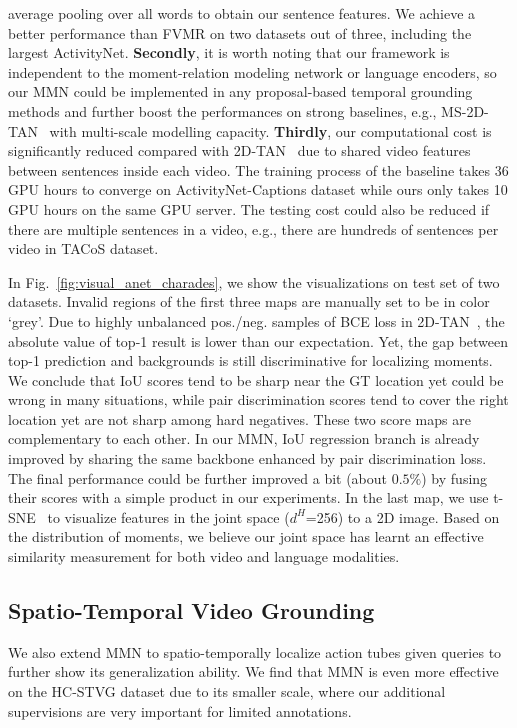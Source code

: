 \documentclass[letterpaper]{article} \usepackage{aaai22}  \usepackage{times}  \usepackage{helvet}  \usepackage{courier}  \usepackage[hyphens]{url}  \usepackage{graphicx} \urlstyle{rm} \def\UrlFont{\rm}  \usepackage{natbib}  \usepackage{caption} \DeclareCaptionStyle{ruled}{labelfont=normalfont,labelsep=colon,strut=off} \frenchspacing  \setlength{\pdfpagewidth}{8.5in}  \setlength{\pdfpageheight}{11in}  \usepackage{algorithm}
\begin{document}
average pooling over all words to obtain our sentence features. We achieve a better performance than FVMR on two datasets out of three, including the largest ActivityNet. 
{\bf Secondly}, it is worth noting that our framework is independent to the moment-relation modeling network or language encoders, so our MMN could be implemented in any proposal-based temporal grounding methods and further boost the performances on strong baselines, e.g., MS-2D-TAN~\cite{DBLP:journals/corr/abs-2012-02646} with multi-scale modelling capacity. 
{\bf Thirdly}, our computational cost is significantly reduced compared with 2D-TAN~\cite{DBLP:conf/aaai/ZhangPFL20} due to shared video features between sentences inside each video. The training process of the baseline takes 36 GPU hours to converge on ActivityNet-Captions dataset while ours only takes 10 GPU hours on the same GPU server. The testing cost could also be reduced if there are multiple sentences in a video, e.g., there are hundreds of sentences per video in TACoS dataset.

 In Fig.~\ref{fig:visual_anet_charades}, we show the visualizations on test set of two datasets. Invalid regions of the first three maps are manually set to be in color `grey'. Due to highly unbalanced pos./neg. samples of BCE loss in 2D-TAN~\cite{DBLP:conf/aaai/ZhangPFL20}, the absolute value of top-1 result is lower than our expectation. Yet, the gap between top-1 prediction and backgrounds is still discriminative for localizing moments. We conclude that IoU scores tend to be sharp near the GT location yet could be wrong in many situations, while pair discrimination scores tend to cover the right location yet are not sharp among hard negatives. These two score maps are complementary to each other. In our MMN, IoU regression branch is already improved by sharing the same backbone enhanced by pair discrimination loss. The final performance could be further improved a bit (about $0.5\%$) by fusing their scores with a simple product in our experiments. In the last map, we use t-SNE~\cite{JMLR:v9:vandermaaten08a} to visualize features in the joint space ($d^H$=256) to a 2D image. Based on the distribution of moments, we believe our joint space has learnt an effective similarity measurement for both video and language modalities.

\subsection{Spatio-Temporal Video Grounding}
We also extend MMN to spatio-temporally localize action tubes given queries to further show its generalization ability. We find that MMN is even more effective on the HC-STVG dataset due to its smaller scale, where our additional supervisions are very important for limited annotations.
\end{document}
